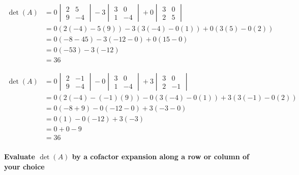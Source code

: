 \documentclass[
  letterpaper,
  DIV=11,
  numbers=noendperiod]{scrartcl}
\let\oldparagraph\paragraph
\renewcommand{\paragraph}[1]{\oldparagraph{#1}\mbox{}}
\begin{document}
\begin{align*}
\det(A) &= 0\begin{vmatrix}2 & 5 \\ 9 & -4\end{vmatrix}-3\begin{vmatrix}3 & 0 \\ 1 & -4\end{vmatrix}+0\begin{vmatrix}3 & 0 \\ 2 & 5\end{vmatrix} \\
&= 0(2(-4)-5(9))-3(3(-4)-0(1))+0(3(5)-0(2)) \\
&= 0(-8-45)-3(-12-0)+0(15-0) \\
&= 0(-53)-3(-12) \\
&= 36
\end{align*}

\begin{align*}
\det(A) &= 0\begin{vmatrix}2 & -1 \\ 9 & -4\end{vmatrix}-0\begin{vmatrix}3 & 0 \\ 1 & -4\end{vmatrix}+3\begin{vmatrix}3 & 0 \\ 2 & -1\end{vmatrix} \\
&= 0(2(-4)-(-1)(9))-0(3(-4)-0(1))+3(3(-1)-0(2)) \\
&= 0(-8+9)-0(-12-0)+3(-3-0) \\
&= 0(1)-0(-12)+3(-3) \\
&= 0+0-9 \\
&= 36
\end{align*}

\newpage{}

\paragraph{\texorpdfstring{Evaluate \(\det(A)\) by a cofactor expansion
along a row or column of your
choice}{Evaluate \textbackslash det(A) by a cofactor expansion along a row or column of your choice}}\label{evaluate-deta-by-a-cofactor-expansion-along-a-row-or-column-of-your-choice}
\end{document}
